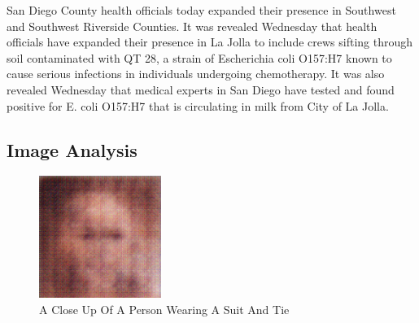 \documentclass{article}%
\begin{document}
San Diego County health officials today expanded their presence in Southwest and Southwest Riverside Counties. It was revealed Wednesday that health officials have expanded their presence in La Jolla to include crews sifting through soil contaminated with QT 28, a strain of Escherichia coli O157:H7 known to cause serious infections in individuals undergoing chemotherapy. It was also revealed Wednesday that medical experts in San Diego have tested and found positive for E. coli O157:H7 that is circulating in milk from City of La Jolla.

%
\subsection{Image Analysis}%
\label{subsec:ImageAnalysis}%


\begin{figure}[h!]%
\centering%
\includegraphics[width=150px]{500_fake_images/samples_5_17.png}%
\caption{A Close Up Of A Person Wearing A Suit And Tie}%
\end{figure}

%
\end{document}
